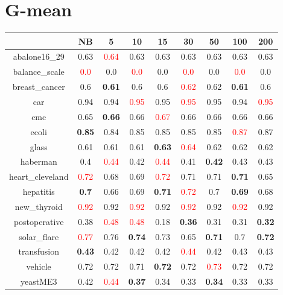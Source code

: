 \documentclass{article}%
\begin{document}
\section*{G{-}mean}%
\begin{tabular}{c|cccccccc}%
\hline%
&NB&5&10&15&30&50&100&200\\%
\hline%
abalone16\_29&0.63&\textcolor{red}{ 
0.64
}&0.63&0.63&0.63&0.63&0.63&0.63\\%
\hline%
balance\_scale&\textcolor{red}{ 
0.0
}&0.0&\textcolor{red}{ 
0.0
}&0.0&\textcolor{red}{ 
0.0
}&0.0&\textcolor{red}{ 
0.0
}&0.0\\%
\hline%
breast\_cancer&0.6&\textbf{0.61}&0.6&0.6&\textcolor{red}{ 
0.62
}&0.62&\textbf{0.61}&0.6\\%
\hline%
car&0.94&0.94&\textcolor{red}{ 
0.95
}&0.95&\textcolor{red}{ 
0.95
}&0.95&0.94&\textcolor{red}{ 
0.95
}\\%
\hline%
cmc&0.65&\textbf{0.66}&0.66&\textcolor{red}{ 
0.67
}&0.66&0.66&0.66&0.66\\%
\hline%
ecoli&\textbf{0.85}&0.84&0.85&0.85&0.85&0.85&\textcolor{red}{ 
0.87
}&0.87\\%
\hline%
glass&0.61&0.61&0.61&\textbf{0.63}&\textcolor{red}{ 
0.64
}&0.62&0.62&0.62\\%
\hline%
haberman&0.4&\textcolor{red}{ 
0.44
}&0.42&\textcolor{red}{ 
0.44
}&0.41&\textbf{0.42}&0.43&0.43\\%
\hline%
heart\_cleveland&\textcolor{red}{ 
0.72
}&0.68&0.69&\textcolor{red}{ 
0.72
}&0.71&0.71&\textbf{0.71}&0.65\\%
\hline%
hepatitis&\textbf{0.7}&0.66&0.69&\textbf{0.71}&\textcolor{red}{ 
0.72
}&0.7&\textbf{0.69}&0.68\\%
\hline%
new\_thyroid&\textcolor{red}{ 
0.92
}&0.92&\textcolor{red}{ 
0.92
}&0.92&\textcolor{red}{ 
0.92
}&0.92&\textcolor{red}{ 
0.92
}&0.92\\%
\hline%
postoperative&0.38&\textcolor{red}{ 
0.48
}&\textcolor{red}{ 
0.48
}&0.18&\textbf{0.36}&0.31&0.31&\textbf{0.32}\\%
\hline%
solar\_flare&\textcolor{red}{ 
0.77
}&0.76&\textbf{0.74}&0.73&0.65&\textbf{0.71}&0.7&\textbf{0.72}\\%
\hline%
transfusion&\textbf{0.43}&0.42&0.42&0.42&\textcolor{red}{ 
0.44
}&0.42&0.43&0.43\\%
\hline%
vehicle&0.72&0.72&0.71&\textbf{0.72}&0.72&\textcolor{red}{ 
0.73
}&0.72&0.72\\%
\hline%
yeastME3&0.42&\textcolor{red}{ 
0.44
}&\textbf{0.37}&0.34&0.33&\textbf{0.34}&0.33&0.33\\%

\end{tabular}
\end{document}
